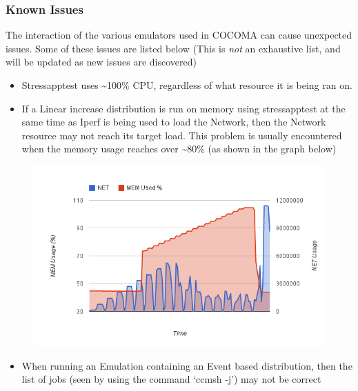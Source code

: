\documentclass[letterpaper,10pt,english]{sphinxhowto}
\begin{document}
\subsubsection{Known Issues}
\label{COCOMA/05_examples:known-issues}
The interaction of the various emulators used in COCOMA can cause unexpected issues. Some of these issues are listed below (This is \emph{not} an exhaustive list, and will be updated as new issues are discovered)
\begin{itemize}
\item {} 
Stressapptest uses \textasciitilde{}100\% CPU, regardless of what resource it is being ran on.

\item {} 
If a Linear increase distribution is run on memory using stressapptest at the same time as Iperf is being used to load the Network, then the Network resource may not reach its target load. This problem is usually encountered when the memory usage reaches over \textasciitilde{}80\% (as shown in the graph below)

\end{itemize}
\begin{figure}[htbp]
\centering

\includegraphics{MEM_NET-Problem.png}
\end{figure}
\begin{itemize}
\item {} 
When running an Emulation containing an Event based distribution, then the list of jobs (seen by using the command `ccmsh -j') may not be correct

\end{itemize}
\end{document}
